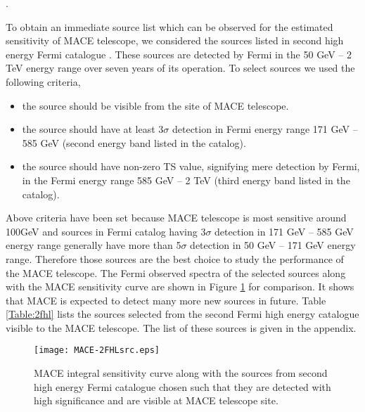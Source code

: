 \documentclass[preprint,12pt]{elsarticle}
\begin{document}
.

 

To obtain an immediate source list which can be observed for the estimated sensitivity of MACE telescope,
 we considered the sources listed in second high energy Fermi catalogue \cite{2fhl}. These sources are detected by Fermi
 in the 50 GeV -- 2 TeV energy range over seven years of its operation. To select sources we used the following
 criteria,
\begin{itemize}
	\item the source should be visible from the site of MACE telescope. 
	\item the source should have at least 3$\sigma$ detection in Fermi energy range 171 GeV -- 585 GeV (second energy band
		listed in the catalog). 
	\item the source should have non-zero TS value, signifying mere detection by Fermi, in the Fermi energy range 
		585 GeV -- 2 TeV (third energy band listed 	in the catalog).
\end{itemize}
Above criteria have been set because MACE telescope is most sensitive around 100GeV and sources in Fermi catalog
having 3$\sigma$ detection in 171 GeV -- 585 GeV energy range generally have more than 5$\sigma$  detection in 
50 GeV -- 171 GeV energy range. Therefore those sources are the best choice to study the 
performance of the MACE telescope. The Fermi observed spectra of the selected sources along with the MACE sensitivity 
curve are shown in Figure \ref{fig:senssrc} for comparison. It shows that MACE is expected to detect many more new
sources in future. Table \ref{Table:2fhl} lists the sources selected from the second Fermi high energy catalogue 
visible to the MACE telescope. The list of these sources is given in the appendix.

\begin{figure}[htpb]
	\begin{center}
		\texttt{[image: MACE-2FHLsrc.eps]}
	\end{center}
	\caption{MACE integral sensitivity curve along with the sources from second high energy Fermi catalogue chosen such that they are detected with high significance 
and are visible at MACE telescope site.}
	\label{fig:senssrc}
\end{figure}
\end{document}

